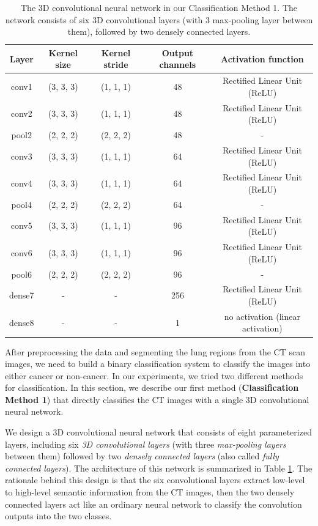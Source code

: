 \documentclass{article}
\begin{document}
\begin{table}[t]
  \begin{center}
  \begin{tabular}{ccccc}
    \toprule
    Layer & Kernel size & Kernel stride & Output channels & Activation function \\
    \midrule
    conv1 & (3, 3, 3) & (1, 1, 1) & 48 & Rectified Linear Unit (ReLU) \\
    conv2 & (3, 3, 3) & (1, 1, 1) & 48 & Rectified Linear Unit (ReLU)\\
    pool2 & (2, 2, 2) & (2, 2, 2) & 48 & - \\
    conv3 & (3, 3, 3) & (1, 1, 1) & 64 & Rectified Linear Unit (ReLU) \\
    conv4 & (3, 3, 3) & (1, 1, 1) & 64 & Rectified Linear Unit (ReLU) \\
    pool4 & (2, 2, 2) & (2, 2, 2) & 64 & - \\
    conv5 & (3, 3, 3) & (1, 1, 1) & 96 & Rectified Linear Unit (ReLU) \\
    conv6 & (3, 3, 3) & (1, 1, 1) & 96 & Rectified Linear Unit (ReLU) \\
    pool6 & (2, 2, 2) & (2, 2, 2) & 96 & - \\
    dense7 & - & - & 256 & Rectified Linear Unit (ReLU) \\
    dense8 & - & - & 1 & no activation (linear activation) \\
    \bottomrule
  \end{tabular}
  \end{center}
  \caption{The 3D convolutional neural network in our Classification Method 1. The network consists of six 3D convolutional layers (with 3 max-pooling layer between them), followed by two densely connected layers.}
  \label{tab:convnet_1}
\end{table}

After preprocessing the data and segmenting the lung regions from the CT scan images, we need to build a binary classification system to classify the images into either cancer or non-cancer. In our experiments, we tried two different methods for classification. In this section, we describe our first method (\textbf{Classification Method 1}) that directly classifies the CT images with a single 3D convolutional neural network.

We design a 3D convolutional neural network that consists of eight parameterized layers, including six \textit{3D convolutional layers} (with three \textit{max-pooling layers} between them) followed by two \textit{densely connected layers} (also called \textit{fully connected layers}). The architecture of this network is summarized in Table \ref{tab:convnet_1}. The rationale behind this design is that the six convolutional layers extract low-level to high-level semantic information from the CT images, then the two densely connected layers act like an ordinary neural network to classify the convolution outputs into the two classes.
\end{document}
